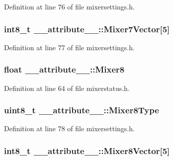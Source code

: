 \-Definition at line 76 of file mixersettings.\-h.

\hypertarget{struct____attribute_____abe2318860fb8225ade075c3eca79d3dc}{
\subsubsection[{\-Mixer7\-Vector}]{\setlength{\rightskip}{0pt plus 5cm}int8\-\_\-t {\bf \-\_\-\-\_\-attribute\-\_\-\-\_\-\-::\-Mixer7\-Vector}\mbox{[}5\mbox{]}}}\label{struct____attribute_____abe2318860fb8225ade075c3eca79d3dc}


\-Definition at line 77 of file mixersettings.\-h.

\hypertarget{struct____attribute_____a1bb6f27ca263e9b3d9cc9cfd16ba67c0}{
\subsubsection[{\-Mixer8}]{\setlength{\rightskip}{0pt plus 5cm}float {\bf \-\_\-\-\_\-attribute\-\_\-\-\_\-\-::\-Mixer8}}}\label{struct____attribute_____a1bb6f27ca263e9b3d9cc9cfd16ba67c0}


\-Definition at line 64 of file mixerstatus.\-h.

\hypertarget{struct____attribute_____a4012aaa0eefed32f539adf08a69c9a8e}{
\subsubsection[{\-Mixer8\-Type}]{\setlength{\rightskip}{0pt plus 5cm}uint8\-\_\-t {\bf \-\_\-\-\_\-attribute\-\_\-\-\_\-\-::\-Mixer8\-Type}}}\label{struct____attribute_____a4012aaa0eefed32f539adf08a69c9a8e}


\-Definition at line 78 of file mixersettings.\-h.

\hypertarget{struct____attribute_____af2df4cacf934b252731b3e7da63f66be}{
\subsubsection[{\-Mixer8\-Vector}]{\setlength{\rightskip}{0pt plus 5cm}int8\-\_\-t {\bf \-\_\-\-\_\-attribute\-\_\-\-\_\-\-::\-Mixer8\-Vector}\mbox{[}5\mbox{]}}}\label{struct____attribute_____af2df4cacf934b252731b3e7da63f66be}


